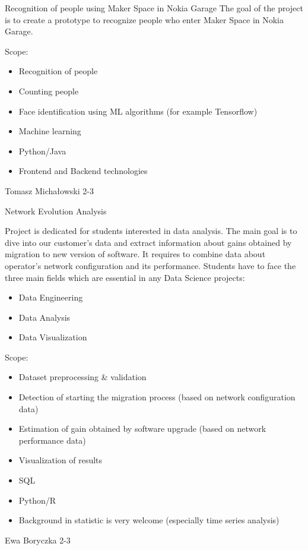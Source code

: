 \begin{project}
{Recognition of people using Maker Space in Nokia Garage}
{The goal of the project is to create a prototype to recognize people who enter Maker Space in Nokia Garage.} 
{
Scope:
\begin{itemize}
	\item Recognition of people
	\item Counting people
	\item Face identification using ML algorithms (for example Tensorflow)
\end{itemize}
}
{
\begin{itemize}
	\item Machine learning
	\item Python/Java
	\item Frontend and Backend technologies
\end{itemize}
}
{Tomasz Michałowski}
{2-3}
\end{project}
\begin{project}
{Network Evolution Analysis}
{Project is dedicated for students interested in data analysis. The main goal is to dive into our customer’s data and extract information about gains obtained by migration to new version of software. It requires to combine data about operator’s network configuration and its performance. Students have to face the three main fields which are essential in any Data Science projects:
\begin{itemize}
	\item Data Engineering
	\item Data Analysis
	\item Data Visualization
\end{itemize}
} 
{
Scope:
\begin{itemize}
	\item Dataset preprocessing \& validation
	\item Detection of starting the migration process (based on network configuration data)
	\item Estimation of gain obtained by software upgrade (based on network performance data)
	\item Visualization of results
\end{itemize}
}
{
\begin{itemize}
	\item SQL
	\item Python/R
	\item Background in statistic is very welcome (especially time series analysis)
\end{itemize}
}
{Ewa Boryczka}
{2-3}
\end{project}
